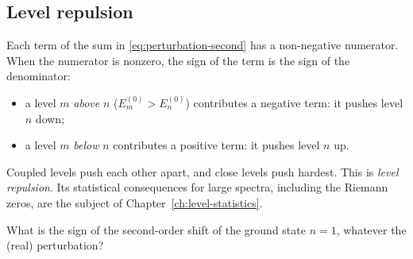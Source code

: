 \subsection{Level repulsion}

Each term of the sum in \cref{eq:perturbation-second} has a non-negative numerator. When the numerator is nonzero, the sign of the term is the sign of the denominator:
\begin{itemize}
\item a level $m$ \emph{above} $n$ ($E_m^{(0)}>E_n^{(0)}$) contributes a negative term: it pushes level $n$ down;
\item a level $m$ \emph{below} $n$ contributes a positive term: it pushes level $n$ up.
\end{itemize}
Coupled levels push each other apart, and close levels push hardest. This is \emph{level repulsion}. Its statistical consequences for large spectra, including the Riemann zeros, are the subject of Chapter~\ref{ch:level-statistics}.

\begin{checkpoint}
What is the sign of the second-order shift of the ground state $n=1$, whatever the (real) perturbation?
\end{checkpoint}

